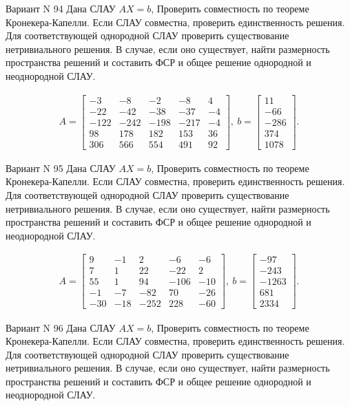 \documentclass[11pt]{report}
\begin{document}
Вариант N 94
Дана СЛАУ $AX = b$,
Проверить совместность по теореме Кронекера-Капелли. Если СЛАУ совместна, проверить единственность решения.
Для соответствующей однородной СЛАУ проверить существование нетривиального решения. В случае, если оно существует,
найти размерность пространства решений и составить ФСР и общее решение однородной  и неоднородной СЛАУ.


\begin{align*}
 A = \left[\begin{matrix}-3 & -8 & -2 & -8 & 4\\-22 & -42 & -38 & -37 & -4\\-122 & -242 & -198 & -217 & -4\\98 & 178 & 182 & 153 & 36\\306 & 566 & 554 & 491 & 92\end{matrix}\right],
\ b = \left[\begin{matrix}11\\-66\\-286\\374\\1078\end{matrix}\right]. 
 \end{align*}

Вариант N 95
Дана СЛАУ $AX = b$,
Проверить совместность по теореме Кронекера-Капелли. Если СЛАУ совместна, проверить единственность решения.
Для соответствующей однородной СЛАУ проверить существование нетривиального решения. В случае, если оно существует,
найти размерность пространства решений и составить ФСР и общее решение однородной  и неоднородной СЛАУ.


\begin{align*}
 A = \left[\begin{matrix}9 & -1 & 2 & -6 & -6\\7 & 1 & 22 & -22 & 2\\55 & 1 & 94 & -106 & -10\\-1 & -7 & -82 & 70 & -26\\-30 & -18 & -252 & 228 & -60\end{matrix}\right],
\ b = \left[\begin{matrix}-97\\-243\\-1263\\681\\2334\end{matrix}\right]. 
 \end{align*}

Вариант N 96
Дана СЛАУ $AX = b$,
Проверить совместность по теореме Кронекера-Капелли. Если СЛАУ совместна, проверить единственность решения.
Для соответствующей однородной СЛАУ проверить существование нетривиального решения. В случае, если оно существует,
найти размерность пространства решений и составить ФСР и общее решение однородной  и неоднородной СЛАУ.
\end{document}
